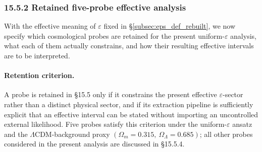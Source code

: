 %
%

\subsubsection*{\normalfont\textbf{15.5.2 \quad Retained five-probe effective analysis}}
\label{subsec:eps_retained_rebuilt}

With the effective meaning of $\varepsilon$ fixed in
\S\ref{subsec:eps_def_rebuilt}, we now specify which cosmological probes
are retained for the present uniform-$\varepsilon$ analysis, what each
of them actually constrains, and how their resulting effective intervals
are to be interpreted.

\paragraph{Retention criterion.}
A probe is retained in \S15.5 only if it constrains the present
effective $\varepsilon$-sector rather than a distinct physical sector,
and if its extraction pipeline is sufficiently explicit that an
effective interval can be stated without importing an uncontrolled
external likelihood. Five probes satisfy this criterion under the
uniform-$\varepsilon$ ansatz and the $\Lambda$CDM-background proxy
$(\Omega_m = 0.315,\ \Omega_\Lambda = 0.685)$; all other probes
considered in the present analysis are discussed in \S15.5.4.

